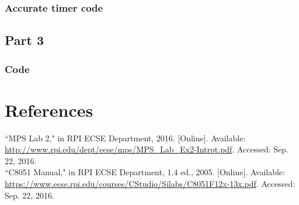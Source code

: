\documentclass[12pt]{article}
\begin{document}
	\subsubsection{Accurate timer code}
				

\subsection{Part 3}
	\subsubsection{Code}
		
	
	
\section{References} 
\noindent
``MPS Lab 2," in RPI ECSE Department, 2016. [Online]. Available: \url{http://www.rpi.edu/dept/ecse/mps/MPS_Lab_Ex2-Intrpt.pdf}. Accessed: Sep. 22, 2016.\\
\newline\noindent
``C8051 Manual," in RPI ECSE Department, 1.4 ed., 2005. [Online]. Available: \url{https://www.ecse.rpi.edu/courses/CStudio/Silabs/C8051F12x-13x.pdf}. Accessed: Sep. 22, 2016.
\end{document}

